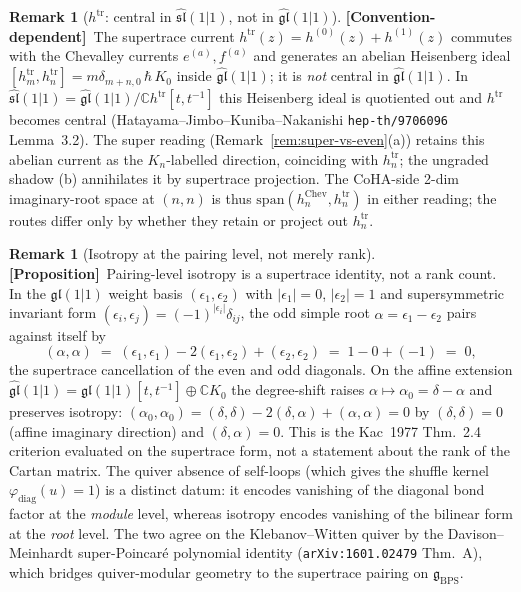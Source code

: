 \documentclass[11pt]{amsart}
\theoremstyle{definition}
\newtheorem{remark}[theorem]{Remark}
\providecommand{\bC}{\mathbb{C}}
\providecommand{\fgl}{\mathfrak{gl}}
\providecommand{\fsl}{\mathfrak{sl}}
\providecommand{\fg}{\mathfrak{g}}
\providecommand{\ClaimStatusProposition}{\textbf{\textsf{[Proposition]}}}
\providecommand{\ClaimStatusConventionDependent}{\textbf{\textsf{[Convention-dependent]}}}
\begin{document}
\begin{remark}[$h^{\mathrm{tr}}$: central in $\widehat{\fsl}(1|1)$, not in $\widehat{\fgl}(1|1)$]
\label{rem:htr-central-fsl}
\ClaimStatusConventionDependent\
The supertrace current $h^{\mathrm{tr}}(z) = h^{(0)}(z) + h^{(1)}(z)$
commutes with the Chevalley currents $e^{(a)}, f^{(a)}$ and generates
an abelian Heisenberg ideal $[h^{\mathrm{tr}}_m, h^{\mathrm{tr}}_n] =
m \delta_{m+n, 0}\, \hbar\, K_0$ inside $\widehat{\fgl}(1|1)$; it is
\emph{not} central in $\widehat{\fgl}(1|1)$. In
$\widehat{\fsl}(1|1) = \widehat{\fgl}(1|1)/\bC h^{\mathrm{tr}}[t,
t^{-1}]$ this Heisenberg ideal is quotiented out and $h^{\mathrm{tr}}$
becomes central (Hatayama--Jimbo--Kuniba--Nakanishi
\texttt{hep-th/9706096} Lemma~3.2). The super reading
(Remark~\ref{rem:super-vs-even}(a)) retains this abelian current as
the $K_n$-labelled direction, coinciding with $h^{\mathrm{tr}}_n$; the
ungraded shadow (b) annihilates it by supertrace projection. The
CoHA-side 2-dim imaginary-root space at $(n,n)$ is thus
$\mathrm{span}(h^{\mathrm{Chev}}_n, h^{\mathrm{tr}}_n)$ in either
reading; the routes differ only by whether they retain or project out
$h^{\mathrm{tr}}_n$.
\end{remark}

\begin{remark}[Isotropy at the pairing level, not merely rank]
\label{rem:isotropy-source}
\ClaimStatusProposition\
Pairing-level isotropy is a supertrace identity, not a rank count. In the
$\fgl(1|1)$ weight basis $(\epsilon_1, \epsilon_2)$ with $|\epsilon_1|
= 0$, $|\epsilon_2| = 1$ and supersymmetric invariant form
$(\epsilon_i, \epsilon_j) = (-1)^{|\epsilon_i|}\delta_{ij}$, the odd
simple root $\alpha = \epsilon_1 - \epsilon_2$ pairs against itself by
\[
  (\alpha, \alpha) \;=\; (\epsilon_1, \epsilon_1)
    - 2(\epsilon_1, \epsilon_2) + (\epsilon_2, \epsilon_2)
  \;=\; 1 - 0 + (-1) \;=\; 0,
\]
the supertrace cancellation of the even and odd diagonals. On the
affine extension $\widehat{\fgl}(1|1) = \fgl(1|1)[t, t^{-1}] \oplus
\bC K_0$ the degree-shift raises $\alpha \mapsto \alpha_0 = \delta -
\alpha$ and preserves isotropy: $(\alpha_0, \alpha_0) = (\delta, \delta)
- 2(\delta, \alpha) + (\alpha, \alpha) = 0$ by $(\delta, \delta) = 0$
(affine imaginary direction) and $(\delta, \alpha) = 0$. This is the
Kac~1977 Thm.~2.4 criterion evaluated on the supertrace form, not a
statement about the rank of the Cartan matrix. The quiver absence of
self-loops (which gives the shuffle kernel $\varphi_{\mathrm{diag}}(u)
= 1$) is a distinct datum: it encodes vanishing of the diagonal bond
factor at the \emph{module} level, whereas isotropy encodes vanishing
of the bilinear form at the \emph{root} level. The two agree on the
Klebanov--Witten quiver by the Davison--Meinhardt super-Poincaré
polynomial identity (\texttt{arXiv:1601.02479} Thm.~A), which bridges
quiver-modular geometry to the supertrace pairing on
$\fg_{\mathrm{BPS}}$.
\end{remark}
\end{document}
